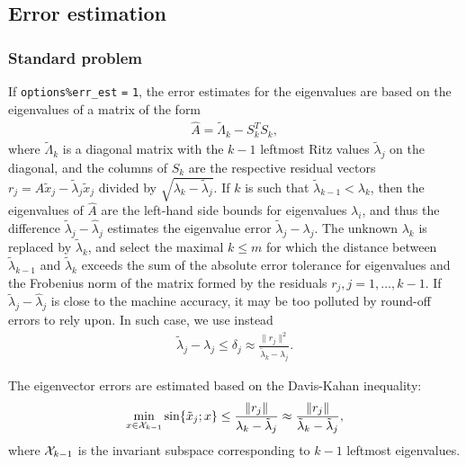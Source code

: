 \subsection{Error estimation}

\label{sec:err.est}

\subsubsection{Standard problem}

If {\tt options\%err\_est} {\tt =} {\tt 1}, 
the error estimates for the eigenvalues are based on 
the eigenvalues of a matrix of the form
%
\begin{eqnarray}
\label{L.mx}
\hat A = %
\tilde\Lambda_k - S_k^T S_k,
\end{eqnarray}
%
where $\tilde\Lambda_k$ is a diagonal matrix with
the $k-1$ leftmost Ritz values $\tilde\lambda_j$
on the diagonal,
and the columns of $S_k$ are the respective
residual vectors $r_j = A \tilde x_j - \tilde\lambda_j \tilde x_j$
divided by $\sqrt{\lambda_k - \tilde\lambda_j}$.
If $k$ is such that
$\tilde\lambda_{k-1} < \lambda_k$,
then the eigenvalues of $\hat A$ are
the left-hand side bounds for
eigenvalues $\lambda_i$,
and thus
the difference $\tilde\lambda_j - \hat\lambda_j$ estimates
the eigenvalue error $\tilde\lambda_j - \lambda_j$.
The unknown  $\lambda_k$ is replaced by $\tilde\lambda_k$,
and select the maximal $k \le m$ for which
the distance between $\tilde\lambda_{k-1}$ and $\tilde\lambda_k$
exceeds the sum of the absolute error tolerance for eigenvalues
and the Frobenius norm of the matrix formed by the residuals
$r_j, j = 1, \ldots, k-1$.
If  $\tilde\lambda_j - \hat\lambda_j$
is close to the machine accuracy, it may be too polluted
by round-off errors to rely upon.
In such case, we use instead
%
\begin{eqnarray}
\label{aL}
\tilde\lambda_j - \lambda_j \le \delta_j \approx
\frac{\|r_j\|^2}{\tilde\lambda_k - \lambda_j}.
\end{eqnarray}

The eigenvector errors are estimated based on 
the Davis-Kahan inequality:
%
\begin{eqnarray}
\label{DK}
\min_{x \in {\cal X}_{k-1}}
\sin\{\tilde x_j; x\} \le
\frac{\|r_j\|}{\lambda_k - \tilde\lambda_j} \approx
\frac{\|r_j\|}{\tilde\lambda_k - \tilde\lambda_j},
\end{eqnarray}
%
where ${\cal X}_{k-1}$ is the invariant subspace 
corresponding to $k-1$ leftmost eigenvalues.

